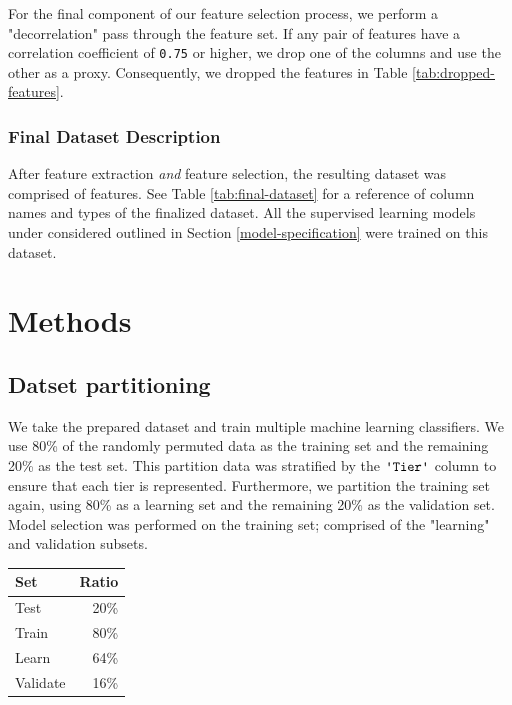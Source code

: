 \documentclass{article}
\newcommand{\Qty}[1]{\oldstylenums{#1}}
\newcommand{\Column}[1]{\ensuremath{\texttt{\textquotesingle{}#1\textquotesingle{}}}\xspace}
\begin{document}
For the final component of our feature selection process, we perform a "decorrelation" pass through the feature set.
If any pair of features have a correlation coefficient of \texttt{0.75} or higher, we drop one of the columns and use the other as a proxy.
Consequently, we dropped the features in Table \ref{tab:dropped-features}.


\hypertarget{final-datset-decription}{
\subsubsection{Final Dataset Description}\label{final-datset-decription}}

After feature extraction \emph{and} feature selection, the resulting dataset was comprised of \Qty{96} features.
See Table \ref{tab:final-dataset} for a reference of column names and types of the finalized dataset.
All the supervised learning models under considered outlined in Section \ref{model-specification} were trained on this dataset.


\section{Methods}


\hypertarget{datset-partitioning}{%
\subsection{Datset partitioning}\label{datset-partitioning}}

We take the prepared dataset and train multiple machine learning classifiers.
We use 80\% of the randomly permuted data as the training set and the remaining 20\% as the test set.
This partition data was stratified by the \Column{Tier} column to ensure that each tier is represented.
Furthermore, we partition the training set again, using 80\% as a learning set and the remaining 20\% as the validation set.
Model selection was performed on the training set; comprised of the "learning" and validation subsets.

\begin{table}[!htbp] \centering 
\caption{Distribution for partitioning dataset,	stratified by \Column{Tier}.}
\label{tab:shrunk-observations}
\begin{longtable}[]{@{}lr@{}}
\toprule
Set & Ratio \\
\midrule
\endhead
Test & 20\% \\
Train & 80\% \\
Learn & 64\% \\
Validate & 16\% \\
\bottomrule
\end{longtable}
\end{table}
\end{document}
